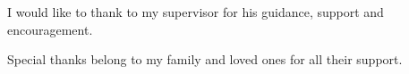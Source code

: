 {~}\vspace{12cm}

\noindent
\begin{minipage}{0.25\textwidth}~\end{minipage}
\begin{center}
\begin{minipage}{1\textwidth}

I would like to thank to my supervisor \mfadvisor  for his guidance, support and encouragement. 

Special thanks belong to my family and loved ones for all their support.

\end{minipage}
\end{center}
\hfill\mfauthor
\vfill\eject 

